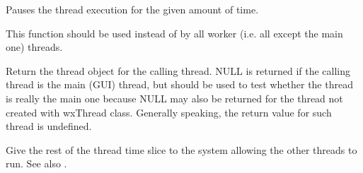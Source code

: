 Pauses the thread execution for the given amount of time.

This function should be used instead of  by all worker
(i.e. all except the main one) threads.

\label{wxthreadthis}


Return the thread object for the calling thread. NULL is returned if the calling thread
is the main (GUI) thread, but  should be used to test
whether the thread is really the main one because NULL may also be returned for the thread
not created with wxThread class. Generally speaking, the return value for such thread
is undefined.

\label{wxthreadyield}


Give the rest of the thread time slice to the system allowing the other threads to run.
See also .
